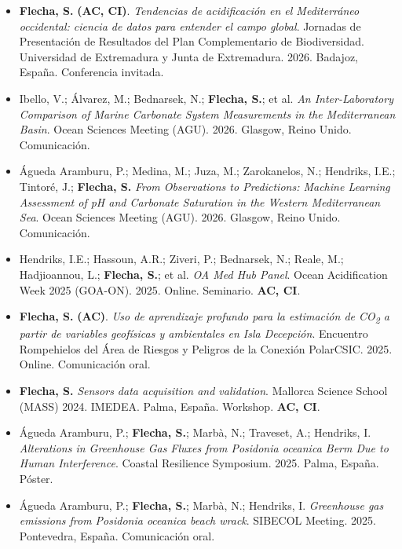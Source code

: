 \documentclass[11pt,a4paper]{article}
\begin{document}
\begin{itemize}[leftmargin=*]

\item[40.] \textbf{Flecha, S.} \textbf{(AC, CI)}. 
\textit{Tendencias de acidificación en el Mediterráneo occidental: ciencia de datos para entender el campo global}. 
Jornadas de Presentación de Resultados del Plan Complementario de Biodiversidad. 
Universidad de Extremadura y Junta de Extremadura. 
2026. Badajoz, España. Conferencia invitada.

\item[39.] Ibello, V.; Álvarez, M.; Bednarsek, N.; \textbf{Flecha, S.}; et al. 
\textit{An Inter-Laboratory Comparison of Marine Carbonate System Measurements in the Mediterranean Basin}. 
Ocean Sciences Meeting (AGU). 2026. Glasgow, Reino Unido. Comunicación.

\item[38.] Águeda Aramburu, P.; Medina, M.; Juza, M.; Zarokanelos, N.; Hendriks, I.E.; Tintoré, J.; \textbf{Flecha, S.} 
\textit{From Observations to Predictions: Machine Learning Assessment of pH and Carbonate Saturation in the Western Mediterranean Sea}. 
Ocean Sciences Meeting (AGU). 2026. Glasgow, Reino Unido. Comunicación.

\item[37.] Hendriks, I.E.; Hassoun, A.R.; Ziveri, P.; Bednarsek, N.; Reale, M.; Hadjioannou, L.; \textbf{Flecha, S.}; et al. 
\textit{OA Med Hub Panel}. 
Ocean Acidification Week 2025 (GOA-ON). 2025. Online. Seminario. \textbf{AC, CI}.

\item[36.] \textbf{Flecha, S.} \textbf{(AC)}. 
\textit{Uso de aprendizaje profundo para la estimación de CO\textsubscript{2} a partir de variables geofísicas y ambientales en Isla Decepción}. 
Encuentro Rompehielos del Área de Riesgos y Peligros de la Conexión PolarCSIC. 
2025. Online. Comunicación oral.

\item[35.] \textbf{Flecha, S.} 
\textit{Sensors data acquisition and validation}. 
Mallorca Science School (MASS) 2024. IMEDEA. Palma, España. Workshop. \textbf{AC, CI}.

\item[34.] Águeda Aramburu, P.; \textbf{Flecha, S.}; Marbà, N.; Traveset, A.; Hendriks, I. 
\textit{Alterations in Greenhouse Gas Fluxes from Posidonia oceanica Berm Due to Human Interference}. 
Coastal Resilience Symposium. 2025. Palma, España. Póster.

\item[33.] Águeda Aramburu, P.; \textbf{Flecha, S.}; Marbà, N.; Hendriks, I. 
\textit{Greenhouse gas emissions from Posidonia oceanica beach wrack}. 
SIBECOL Meeting. 2025. Pontevedra, España. Comunicación oral.


\end{itemize}
\end{document}
